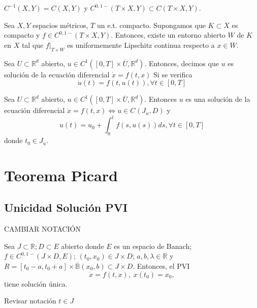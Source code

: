 \begin{obs}
  $C^{-1}(X,Y) = C(X,Y)$ y $C^{0,1-}(T \times X, Y) \subset C(T \times X, Y)$.
\end{obs}

\begin{prop}
  Sea $X,Y$ espacios métricos, $T$ un e.t. compacto. Supongamos que $K \subset X$ es compacto y $f \in C^{0,1-}(T \times X, Y)$. Entonces, existe un entorno abierto $W$ de $K$ en $X$ tal que $f|_{T \times W}$ es uniformemente Lipschitz continua respecto a $x \in W$.
\end{prop}

\begin{defn}
  Sea $U \subset \mathbb{R}^{d}$ abierto, $u \in C^{1}([0,T] \times \overline{U}, \mathbb{R}^{d})$. Entonces, decimos que $u$ es solución de la ecuación diferencial $\dot{x} = f(t,x)$ Si se verifica
  \[
    \dot{u}(t) = f(t, u(t)), \forall t \in [0, T]
  \]
\end{defn}

\begin{lem}
  Sea $U \subset \mathbb{R}^{d}$ abierto, $u \in C^{1}([0,T] \times \overline{U}, \mathbb{R}^{d})$. Entonces $u$ es una solución de la ecuación diferencial $\dot{x} = f(t,x) \Leftrightarrow u \in C^{}(J_{u}, D)$ y
      \[ 
        u(t) = u_{0} + \int_{0}^{t} f(s, u(s)) ds, \forall t \in [0, T] 
      \] 
      donde $t_{0} \in J_{u}$.
\end{lem}

\section{Teorema Picard}
\subsection{Unicidad Solución PVI}

CAMBIAR NOTACIÓN

\begin{theo}
  Sea $J \subset \mathbb{R}; D \subset E$ abierto donde $E$ es un espacio de Banach; $f \in C^{0,1-}(J \times D, E)$; $(t_{0}, x_{0}) \in J \times D$; $ a, b, \lambda \in \mathbb{R}$ y $R = [t_{0} - a, t_{0} + a] \times \overline{\mathbb{B}}(x_{0}, b) \subset J \times D$. Entonces, el PVI
  \[ 
    \dot{x} = f(t, x), \; x(t_{0}) = x_{0},
  \] 
  tiene solución única.
\end{theo}

Revisar notación $t \in J$


